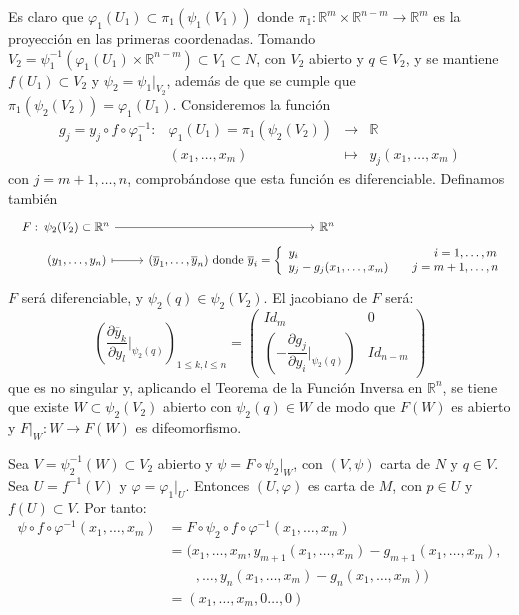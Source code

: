 \begin{dem}
Es claro que $\varphi_1(U_1) \subset \pi_1(\psi_1(V_1))$ donde $\pi_1: \mathbb{R}^m \times \mathbb{R}^{n-m} \to \mathbb{R}^m$ es la proyección en las primeras coordenadas. Tomando $V_2 = \psi_1^{-1}(\varphi_1(U_1) \times \mathbb{R}^{n-m}) \subset V_1 \subset N$, con $V_2$ abierto y $q \in V_2$, y se mantiene $f(U_1) \subset V_2$ y $\psi_2 = \psi_1 |_{V_2}$, además de que se cumple que $\pi_1(\psi_2(V_2)) = \varphi_1(U_1)$. Consideremos la función $$\begin{array}{rrcl}
     g_j = y_j \circ f \circ \varphi_1^{-1} : &  \varphi_1(U_1) = \pi_1(\psi_2(V_2))&  \longrightarrow &\mathbb{R}  \\
     & (x_1,\ldots, x_m) & \longmapsto & y_j(x_1, \ldots, x_m)
\end{array}$$
con $j= m+1, \dots, n$, comprobándose que esta función es diferenciable. Definamos también 
$$\begin{tikzcd}
F:\hspace{-12mm} & \psi_2(V_2) \subset\mathbb{R}^n \arrow{r} & \mathbb{R}^n \\[-5mm]
& (y_1,\dots,y_n) \arrow[mapsto]{r} & (\overline{y}_1,\dots,\overline{y}_n) \text{ donde } \overline{y}_i=\left\{ \begin{array}{ll}
y_i \hspace{40mm} i = 1,\dots,m\\
y_j - g_j(x_1,\dots,x_m) \qquad j = m+1, \dots, n
\end{array} \right.
\end{tikzcd}$$
$F$ será diferenciable, y $\psi_2(q) \in \psi_2(V_2)$. El jacobiano de $F$ será:
$$\left(\frac{\partial \overline{y}_k}{\partial y_l} \Big|_{\psi_2(q)} \right)_{1 \leq k,l \leq n} = \left(\begin{array}{c|c}
    Id_m & 0  \\
   \hline \left(-\dfrac{\partial g_j}{\partial y_i} \Big|_{\psi_2(q)} \right) & Id_{n-m}
\end{array}\right)$$
que es no singular y, aplicando el Teorema de la Función Inversa en $\mathbb{R}^n$, se tiene que existe $W \subset \psi_2(V_2)$ abierto con $\psi_2(q) \in W$ de modo que $F(W)$ es abierto y $F|_W:W\to F(W)$ es difeomorfismo.

Sea $V = \psi_2^{-1}(W)\subset V_2$ abierto y $\psi = F \circ \psi_2|_W$, con $(V,\psi)$ carta de $N$ y $q \in V$. Sea $U = f^{-1}(V)$ y $\varphi= \varphi_1|_U$. Entonces $(U,\varphi)$ es carta de $M$, con $p \in U$ y $f(U) \subset V$. Por tanto:
\[\begin{split} \psi\circ f \circ \varphi^{-1}(x_1,\dots,x_m) & = F \circ \psi_2 \circ f \circ \varphi^{-1}(x_1,\dots,x_m) \\ & = (x_1,\dots,x_m,  y_{m+1} (x_1,\dots,x_m) - g_{m+1}(x_1,\dots,x_m) , \\ & \qquad ,\dots, y_n (x_1,\dots,x_m)-g_{n}(x_1,\dots,x_m)) \\ &  = (x_1,\dots,x_m,0\dots,0) \end{split} \]
\end{dem}
